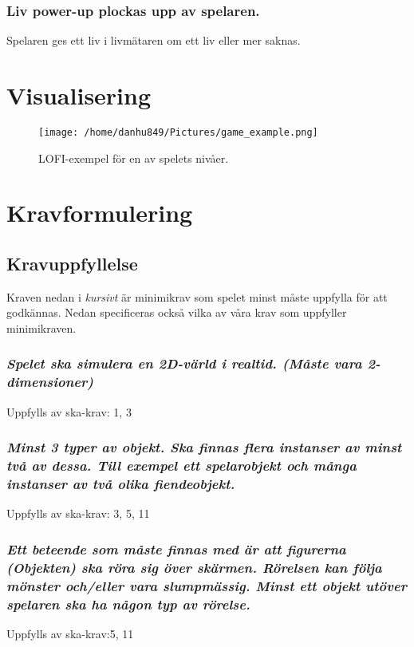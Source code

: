 \documentclass{TDP005mall}
\begin{document}
\subsubsection{Liv power-up plockas upp av spelaren.}
Spelaren ges ett liv i livmätaren om ett liv eller mer saknas. 

\newpage
\section{Visualisering}%

\begin{figure}[h!]
  \centerline{\texttt{[image: /home/danhu849/Pictures/game\_example.png]}}
  \caption{LOFI-exempel för en av spelets nivåer.\label{fig}}
\end{figure}

\section{Kravformulering}
\subsection{Kravuppfyllelse}
Kraven nedan i \emph{kursivt} är minimikrav som spelet minst måste uppfylla för att godkännas. Nedan specificeras också vilka av våra krav som uppfyller minimikraven.

\subsubsection{\emph{ Spelet ska simulera en 2D-värld i realtid. (Måste vara 2-dimensioner)}}
Uppfylls av ska-krav: 1, 3

\subsubsection{\emph{ Minst 3 typer av objekt. Ska finnas flera instanser av minst två av dessa. Till exempel ett spelarobjekt och många instanser av två olika fiendeobjekt.}}
Uppfylls av ska-krav: 3, 5, 11

\subsubsection{\emph{ Ett beteende som måste finnas med är att figurerna (Objekten) ska röra sig över skärmen. Rörelsen kan följa mönster och/eller vara slumpmässig. Minst ett objekt utöver spelaren ska ha någon typ av rörelse.}}
Uppfylls av ska-krav:5, 11
\end{document}
